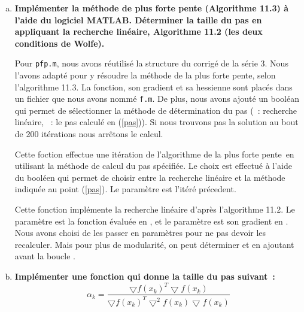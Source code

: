 \documentclass[11pt,a4paper,twoside,onecolumn,titlepage]{report}
\newcommand{\pfp}{plus forte pente}
\newcommand{\question}[1]{\textbf{#1}}
\begin{document}
\begin{enumerate}[(a)]
\item\label{pfp} \question{Implémenter la méthode de plus forte pente (Algorithme 11.3) à l'aide du logiciel MATLAB. Déterminer la taille du pas en appliquant la recherche linéaire, Algorithme 11.2 (les deux conditions de Wolfe).}

%
%

Pour \texttt{pfp.m}, nous avons réutilisé la structure du corrigé de la série 3. Nous l'avons adapté pour y résoudre la méthode de la plus forte pente, selon l'algorithme 11.3. La fonction, son gradient et sa hessienne sont placés dans un fichier que nous avons nommé \texttt{f.m}. De plus, nous avons ajouté un booléan  qui permet de sélectionner la méthode de détermination du pas (~: recherche linéaire, ~: le pas calculé en (\ref{pas})). Si nous trouvons pas la solution au bout de 200 itérations nous arrêtons le calcul.



Cette foction effectue une itération de l'algorithme de la \pfp\ en utilisant la méthode de calcul du pas spécifiée. Le choix est effectué à l'aide du booléen  qui permet de choisir entre la recherche linéaire et la méthode indiquée au point (\ref{pas}). Le paramètre  est l'itéré précedent.

%
%

Cette fonction implémente la recherche linéaire d'après l'algorithme 11.2. Le paramètre  est la fonction évaluée en , et le paramètre  est son gradient en . Nous avons choisi de les passer en paramètres pour ne pas devoir les recalculer. Mais pour plus de modularité, on peut déterminer  et  en ajoutant  avant la boucle .

%
%
%

\item\label{pas} \question{Implémenter une fonction qui donne la taille du pas suivant~:}
\begin{equation}\label{eq:cauchy}
\alpha_k = \frac{\bigtriangledown f(x_k)^T \bigtriangledown f(x_k)}{\bigtriangledown f(x_k)^T \bigtriangledown^2 f(x_k) \bigtriangledown f(x_k)}
\end{equation}


\end{enumerate}
\end{document}
